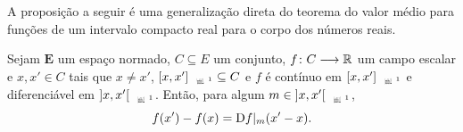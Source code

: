 A proposição a seguir é uma generalização direta do teorema do valor médio para funções de um intervalo compacto real para o corpo dos números reais.

\begin{proposition}
\label{prop:valor.medio.campo.escalar}
Sejam $\bm E$ um espaço normado, $C \subseteq E$ um conjunto, ${f}\colon {C} \longrightarrow {\mathbb{R}}$ um campo escalar e $x,x' \in C$ tais que $x \neq x'$, $\Sxger{x,x'} \subseteq C$ e $f$ é contínuo em $\Sxger{x,x'}$ e diferenciável em $\Sxgera{x,x'}$. Então, para algum $m \in \Sxgera{x,x'}$,
	\begin{equation*}
	f(x') - f(x) = \mathrm{D} f|_m(x'-x).
	\end{equation*}
\end{proposition}
%
